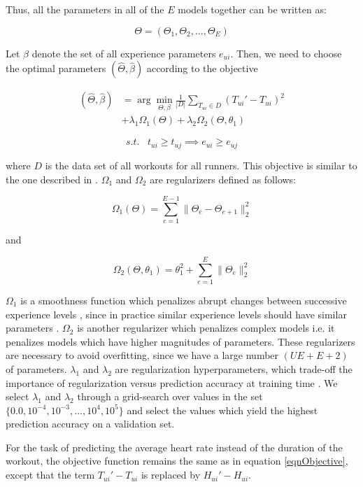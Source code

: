 \documentclass{acm_proc_article-sp}
\begin{document}
Thus, all the parameters in all of the $E$ models together can be written as:

$$\Theta = (\Theta_1, \Theta_2,..., \Theta_E)$$

Let $\beta$ denote the set of all experience parameters $e_{ui}$. Then, we need to choose the optimal parameters $(\hat{\Theta}, \hat{\beta})$ according to the objective


\begin{align}
\label{eqnObjective}
(\hat{\Theta}, \hat{\beta})  &= \arg\min_{\Theta,\beta}\frac{1}{|D|} \sum_{T_{ui} \in D}(T_{ui}' - T_{ui})^2 \nonumber \\
 & + \lambda_1\Omega_1(\Theta) + \lambda_2\Omega_2(\Theta, \theta_1)
\end{align}

$$s.t. \; \; \; t_{ui} \geq t_{uj} \implies e_{ui} \geq e_{uj} $$

where $D$ is the data set of all workouts for all runners. This objective is similar to the one described in \cite{www13}. $\Omega_1$ and $\Omega_2$ are regularizers defined as follows:

$$\Omega_1(\Theta) = \sum_{e=1}^{E-1}{\|\Theta_e - \Theta_{e+1}\|_2^2}$$

and

$$\Omega_2(\Theta, \theta_1) = \theta_1^2 + \sum_{e=1}^{E}{\|\Theta_e \|_2^2}$$

$\Omega_1$ is a smoothness function which penalizes abrupt changes between successive experience levels \cite{www13}, since in practice similar experience levels should have similar parameters \cite{www13}. $\Omega_2$ is another regularizer which penalizes complex models i.e. it penalizes models which have higher magnitudes of parameters. These regularizers are necessary to avoid overfitting, since we have a large number $(UE + E + 2)$ of parameters. $\lambda_1$ and $\lambda_2$ are regularization hyperparameters, which trade-off the importance of regularization versus prediction accuracy at training time \cite{www13}. We select $\lambda_1$ and $\lambda_2$ through a grid-search over values in the set $\{0.0, 10^{-4}, 10^{-3},..., 10^4, 10^5\}$ and select the values which yield the highest prediction accuracy on a validation set.

For the task of predicting the average heart rate instead of the duration of the workout, the objective function remains the same as in equation \ref{eqnObjective}, except that the term $T_{ui}' - T_{ui}$ is replaced by $H_{ui}' - H_{ui}$.
\end{document}
